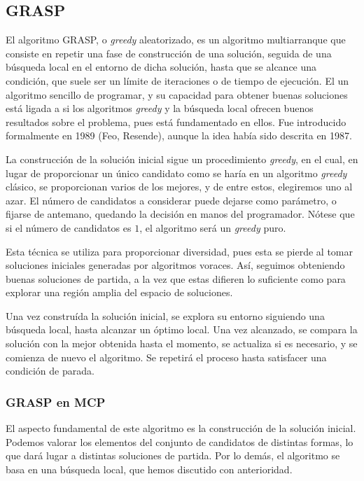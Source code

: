 \subsection{GRASP}

El algoritmo GRASP, o \textit{greedy} aleatorizado, es un algoritmo multiarranque que consiste
en repetir una fase de construcción de una solución, seguida de una búsqueda local en el entorno
de dicha solución, hasta que se alcance una condición, que suele ser un límite de iteraciones
o de tiempo de ejecución. El un algoritmo sencillo de programar, y su capacidad para obtener
buenas soluciones está ligada a si los algoritmos \textit{greedy} y la búsqueda local ofrecen
buenos resultados sobre el problema, pues está fundamentado en ellos. Fue introducido formalmente
en 1989 (Feo, Resende), aunque la idea había sido descrita en 1987.

La construcción de la solución inicial sigue un procedimiento \textit{greedy}, en el cual,
en lugar de proporcionar un único candidato como se haría en un algoritmo \textit{greedy}
clásico, se proporcionan varios de los mejores, y de entre estos, elegiremos uno al azar.
El número de candidatos a considerar puede dejarse como parámetro, o fijarse de antemano,
quedando la decisión en manos del programador. Nótese que si el número de candidatos es
$1$, el algoritmo será un \textit{greedy} puro.

Esta técnica se utiliza para proporcionar diversidad, pues esta se pierde al tomar soluciones
iniciales generadas por algoritmos voraces. Así, seguimos obteniendo buenas soluciones de
partida, a la vez que estas difieren lo suficiente como para explorar una región amplia del
espacio de soluciones.

Una vez construída la solución inicial, se explora su entorno siguiendo una búsqueda local,
hasta alcanzar un óptimo local. Una vez alcanzado, se compara la solución con la mejor obtenida
hasta el momento, se actualiza si es necesario, y se comienza de nuevo el algoritmo.
Se repetirá el proceso hasta satisfacer una condición de parada.

\subsubsection{GRASP en MCP}

El aspecto fundamental de este algoritmo es la construcción de la solución inicial.
Podemos valorar los elementos del conjunto de candidatos de distintas formas, lo que
dará lugar a distintas soluciones de partida. Por lo demás, el algoritmo se basa en
una búsqueda local, que hemos discutido con anterioridad.

